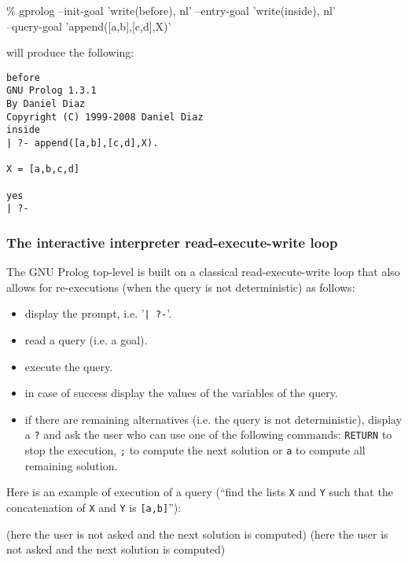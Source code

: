 \begin{Code}
\% gprolog --init-goal 'write(before), nl' --entry-goal 'write(inside), nl'\\
--query-goal 'append([a,b],[c,d],X)'
\end{Code}

will produce the following:

\begin{Code}
\begin{verbatim}
before
GNU Prolog 1.3.1
By Daniel Diaz
Copyright (C) 1999-2008 Daniel Diaz
inside
| ?- append([a,b],[c,d],X).

X = [a,b,c,d]

yes
| ?-
\end{verbatim}
\end{Code}

\subsubsection{The interactive interpreter read-execute-write loop}
The GNU Prolog top-level is built on a classical read-execute-write loop that
also allows for re-executions (when the query is not deterministic) as
follows:

\begin{itemize}

\item display the prompt, i.e. '\texttt{| ?-}'.

\item read a query (i.e. a goal).

\item execute the query.

\item in case of success display the values of the variables of the query.

\item if there are remaining alternatives (i.e. the query is not
deterministic), display a \texttt{?} and ask the user who can use one of the
following commands: \texttt{RETURN} to stop the execution, \texttt{;} to
compute the next solution or \texttt{a} to compute all remaining solution.

\end{itemize}

Here is an example of execution of a query (``find the lists \texttt{X} and
\texttt{Y} such that the concatenation of \texttt{X} and \texttt{Y} is
\texttt{[a,b]}''):

\begin{CodeTwoCols}
\SkipLine
{} 
\SkipLine
{}
\SkipLine
{}
    {(here the user is not asked and the next solution is
computed)}
\SkipLine
{}
     {(here the user is not asked and the next solution is
computed)}
\SkipLine
{}
\end{CodeTwoCols}


